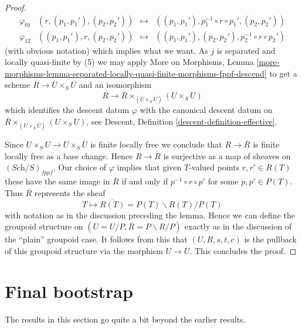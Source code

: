 \begin{proof}
$$\begin{matrix}
\varphi_{01} & (r, (p_1, p_1'), (p_2, p_2')) & \mapsto &
((p_1, p_1'), p_1^{-1} \circ r \circ p_1', (p_2, p_2')) \\
\varphi_{12} & ((p_1, p_1'), r, (p_2, p_2')) & \mapsto &
((p_1, p_1'), (p_2, p_2'), p_2^{-1} \circ r \circ p_2')
\end{matrix}
$$
(with obvious notation) which implies what we want.
As $j$ is separated and locally quasi-finite by (5) we may apply
More on Morphisms, Lemma
\ref{more-morphisms-lemma-separated-locally-quasi-finite-morphisms-fppf-descend}
to get a scheme $\overline{R} \to \overline{U} \times_S \overline{U}$
and an isomorphism
$$
R \to \overline{R} \times_{(\overline{U} \times_S \overline{U})} (U \times_S U)
$$
which identifies the descent datum $\varphi$ with the canonical
descent datum on
$\overline{R} \times_{(\overline{U} \times_S \overline{U})} (U \times_S U)$,
see
Descent, Definition \ref{descent-definition-effective}.

\medskip\noindent
Since $U \times_S U \to \overline{U} \times_S \overline{U}$ is finite
locally free we conclude that $R \to \overline{R}$ is finite locally free
as a base change. Hence $R \to \overline{R}$ is surjective as a map of
sheaves on $(\textit{Sch}/S)_{fppf}$.
Our choice of $\varphi$ implies that given $T$-valued points $r, r' \in R(T)$
these have the same image in $\overline{R}$ if and only if
$p^{-1} \circ r \circ p'$ for some $p, p' \in P(T)$. Thus
$\overline{R}$ represents the sheaf
$$
T \longmapsto  \overline{R(T)} = P(T)\backslash R(T)/P(T)
$$
with notation as in the discussion preceding the lemma.
Hence we can define the groupoid structure on
$(\overline{U} = U/P, \overline{R} = P\backslash R/P)$ exactly as in
the discussion of the ``plain'' groupoid case.
It follows from this that $(U, R, s, t, c)$ is the pullback of
this groupoid structure via the morphism $U \to \overline{U}$.
This concludes the proof.
\end{proof}















\section{Final bootstrap}
\label{section-final-bootstrap}

\noindent
The results in this section go quite a bit beyond the earlier results.

